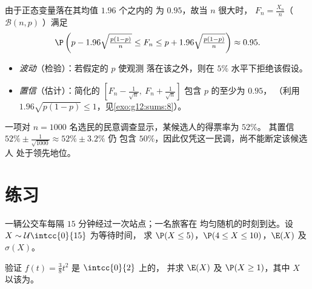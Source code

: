 \begin{method}[$95\%$ 水平下的波动区间]\label{met:g12:contdist:fluctuation}
由于正态变量落在其均值 $1.96$ 个之内的
为 $0.95$，故当 $n$ 很大时，
 $F_n = \frac{X_n}{n}$（$\mathcal B(n,p)$ ）满足
\[
\P\left(p - 1.96\sqrt{\tfrac{p(1-p)}{n}} \leq F_n \leq
p + 1.96\sqrt{\tfrac{p(1-p)}{n}}\right) \approx 0.95 .
\]
\begin{itemize}
  \item \emph{波动}（检验）：若假定的 $p$ 使观测
        落在该之外，则在
        $5\%$ 水平下拒绝该假设。
  \item \emph{置信}（估计）：简化的
        $\left[F_n - \frac{1}{\sqrt n},\ F_n + \frac{1}{\sqrt n}\right]$
        包含 $p$ 的至少为 $0.95$，
        （利用 $1.96\sqrt{p(1-p)} \leq 1$，见\cref{exo:g12:sums:8}）。
\end{itemize}
\end{method}

\begin{example}\label{ex:g12:contdist:poll}
一项对 $n = 1000$ 名选民的民意调查显示，某候选人的得票率为 $52\%$。
其置信 $52\% \pm \frac{1}{\sqrt{1000}} \approx 52\% \pm 3.2\%$ 仍
包含 $50\%$，因此仅凭这一民调，尚不能断定该候选人
处于领先地位。
\end{example}

\section{练习}

\begin{exercise}[$\star$]\label{exo:g12:contdist:1}
一辆公交车每隔 $15$ 分钟经过一次站点；一名旅客在
均匀随机的时刻到达。设 $X \sim \mathcal U\intcc{0}{15}$ 为等待时间，
求 $\P(X \leq 5)$，$\P(4 \leq X \leq 10)$，$\E(X)$ 及 $\sigma(X)$。
\end{exercise}

\begin{exercise}[$\star$]\label{exo:g12:contdist:2}
验证 $f(t) = \frac{3}{8}t^2$ 是 $\intcc{0}{2}$ 上的，
并求 $\E(X)$ 及 $\P(X \geq 1)$，其中 $X$ 以该为。
\end{exercise}

